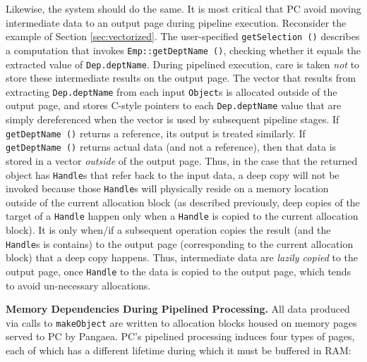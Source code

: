 Likewise, the system should do the same.  It is most critical that PC avoid moving intermediate data to an output page during pipeline execution.
Reconsider the example of Section \ref{sec:vectorized}.  The user-specified \texttt{getSelection ()} describes
a computation that invokes \texttt{Emp::getDeptName ()}, checking whether it equals the extracted value of
\texttt{Dep.deptName}.  During pipelined execution, care is taken \emph{not} to store these intermediate results
on the output page.  The vector that results from extracting \texttt{Dep.deptName} from each input 
\texttt{Object}s is allocated outside of the output page, and stores C-style pointers to each \texttt{Dep.deptName}
value that are simply dereferenced when the vector is used by subsequent pipeline stages.  
If \texttt{getDeptName ()} returns a reference, its output is treated similarly.  If 
\texttt{getDeptName ()} returns actual data (and not a reference), then that data is stored in a vector \emph{outside}
of the output page.  Thus, in the case that the returned object has \texttt{Handle}s that refer back to the input data, a deep
copy will not be invoked because those \texttt{Handle}s will physically reside on a memory location outside of the current
allocation block (as described previously, deep copies of the target of a \texttt{Handle}
happen only when a \texttt{Handle} is copied to the current allocation block).  
It is only when/if a subsequent operation copies the result (and the \texttt{Handle}s is contains)
to the output page (corresponding to the current allocation block) that a deep copy happens.  Thus, intermediate data are \emph{lazily copied} to 
the output page, once \texttt{Handle} to the data is copied to the output page, which tends to avoid un-necessary allocations.

\vspace{5 pt}
\noindent
\textbf{Memory Dependencies During Pipelined Processing.}
All data produced via calls to \texttt{makeObject} are written to allocation blocks housed on memory pages served to PC by Pangaea.  PC's pipelined
processing induces four types of pages, each of which has a different lifetime during which it must be buffered in RAM:

